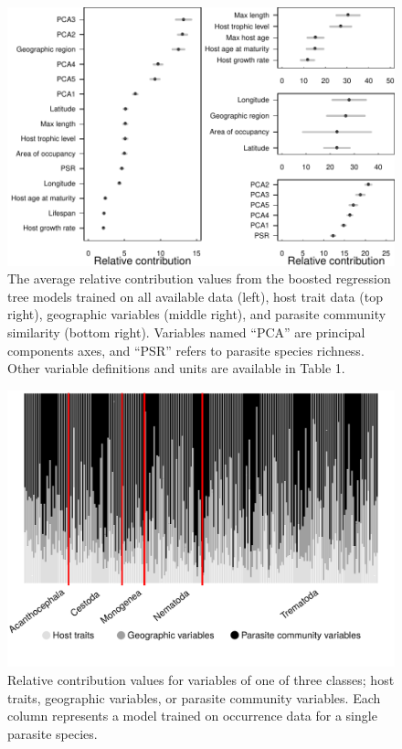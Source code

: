 \documentclass[12pt]{article}
\begin{document}
 
\newpage
 \begin{figure}[h!]
  \includegraphics[width=\textwidth]{Figures/megaBRT.pdf}
  \caption{The average relative contribution values from the boosted regression tree models trained on all available data (left), host trait data (top right), geographic variables (middle right), and parasite community similarity (bottom right). Variables named ``PCA'' are principal components axes, and ``PSR'' refers to parasite species richness. Other variable definitions and units are available in Table 1. }
 \label{fig:megaBRT}
 \end{figure}

 
 
 \newpage
 \begin{figure}[h!]
  \includegraphics[width=\textwidth]{Figures/allDataColorGS1.pdf}
  \caption{Relative contribution values for variables of one of three classes; host traits, geographic variables, or parasite community variables. Each column represents a model trained on occurrence data for a single parasite species.}
 \label{fig:allDataBar}
 \end{figure}
\end{document}
